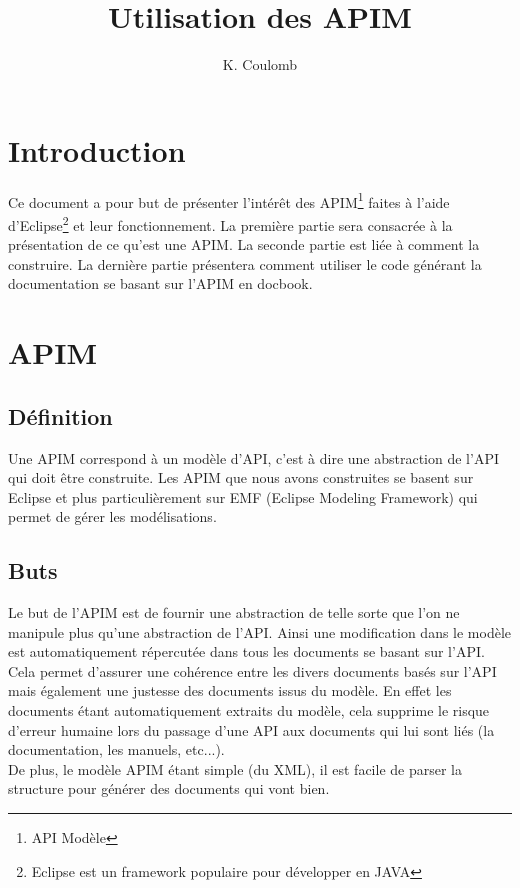\documentclass{article}
\title{Utilisation des APIM}
\author{K. Coulomb}
\begin{document}
\frontmatter %
\maketitle %
\tableofcontents %
\mainmatter %


\section*{Introduction}
Ce document a pour but de pr\'esenter l'int\'er\^et des APIM\footnote{API Mod\`ele} faites \`a l'aide d'Eclipse\footnote{Eclipse est un framework populaire pour d\'evelopper en JAVA} et leur fonctionnement. La premi\`ere partie sera consacr\'ee \`a la pr\'esentation de ce qu'est une APIM. La seconde partie est li\'ee \`a comment la construire. La derni\`ere partie pr\'esentera comment utiliser le code g\'en\'erant la documentation se basant sur l'APIM en docbook.


\section*{APIM}
\subsection*{D\'efinition}
Une APIM correspond \`a un mod\`ele d'API, c'est \`a dire une abstraction de l'API qui doit \^etre construite. Les APIM que nous avons construites se basent sur Eclipse et plus particuli\`erement sur EMF (Eclipse Modeling Framework) qui permet de g\'erer les mod\'elisations.
\subsection*{Buts}
Le but de l'APIM est de fournir une abstraction de telle sorte que l'on ne manipule plus qu'une abstraction de l'API. Ainsi une modification dans le mod\`ele est automatiquement r\'epercut\'ee dans tous les documents se basant sur l'API. Cela permet d'assurer une coh\'erence entre les divers documents bas\'es sur l'API mais \'egalement une justesse des documents issus du mod\`ele. En effet les documents \'etant automatiquement extraits du mod\`ele, cela supprime le risque d'erreur humaine lors du passage d'une API aux documents qui lui sont li\'es (la documentation, les manuels, etc...). \\
De plus, le mod\`ele APIM \'etant simple (du XML), il est facile de parser la structure pour g\'en\'erer des documents qui vont bien.
\end{document}
